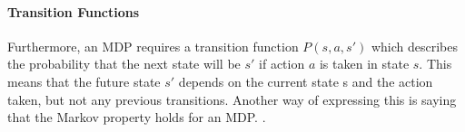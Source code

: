 \paragraph{Transition Functions}

Furthermore, an MDP requires a transition function $P(s, a, s')$ which describes the probability that the next state will be $s'$ if action $a$ is taken in state $s$. This means that the future state $s'$ depends on the current state s and the action taken, but not any previous transitions. Another way of expressing this is saying that the Markov property holds for an MDP. \parencite{altman2002applications}.

